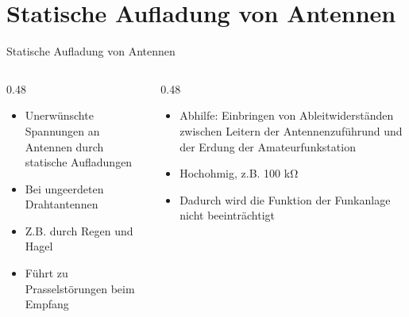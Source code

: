 \section{Statische Aufladung von Antennen}
\label{section:statische_aufladung}
\begin{frame}{Statische Aufladung von Antennen}
    \begin{columns}
        \begin{column}{0.48\textwidth}
            \begin{itemize}
                \item Unerwünschte Spannungen an Antennen durch statische Aufladungen
                \item Bei ungeerdeten Drahtantennen
                \item Z.B. durch Regen und Hagel
                \item Führt zu Prasselstörungen beim Empfang
            \end{itemize}
        \end{column}
        \begin{column}{0.48\textwidth}
            \begin{itemize}
                \item Abhilfe: Einbringen von Ableitwiderständen zwischen Leitern der Antennenzuführund und der Erdung der Amateurfunkstation
                \item Hochohmig, z.B. 100 kΩ
                \item Dadurch wird die Funktion der Funkanlage nicht beeinträchtigt
            \end{itemize}
        \end{column}
    \end{columns}
\end{frame}

